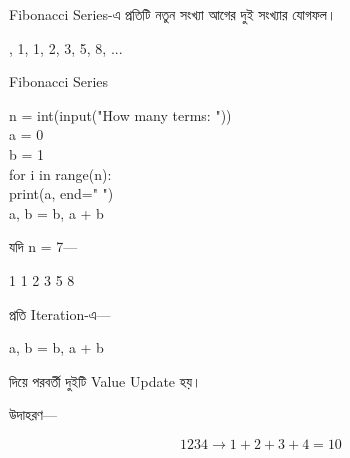 
Fibonacci Series-এ প্রতিটি নতুন সংখ্যা আগের দুই সংখ্যার যোগফল।

\begin{center}
\textenglish{, 1, 1, 2, 3, 5, 8, ...}
\end{center}

\begin{codeoutputbox}{Fibonacci Series}

\noindent
\begin{minipage}[t]{0.53\linewidth}
\codeheading

\begin{english}
\ttfamily
n = int(input("How many terms: "))\\
a = 0\\
b = 1\\[0.5mm]
for i in range(n):\\
\hspace*{4mm}print(a, end=" ")\\
\hspace*{4mm}a, b = b, a + b
\end{english}

\end{minipage}
\hfill
\begin{minipage}[t]{0.43\linewidth}
\outputheading

যদি
\textenglish{\ttfamily n = 7}—

\begin{center}
\textenglish{ 1 1 2 3 5 8}
\end{center}

প্রতি Iteration-এ—

\begin{center}
\textenglish{\ttfamily a, b = b, a + b}
\end{center}

দিয়ে পরবর্তী দুইটি Value Update হয়।

\end{minipage}

\end{codeoutputbox}



উদাহরণ—

\[
1234 \longrightarrow 1+2+3+4=10
\]

